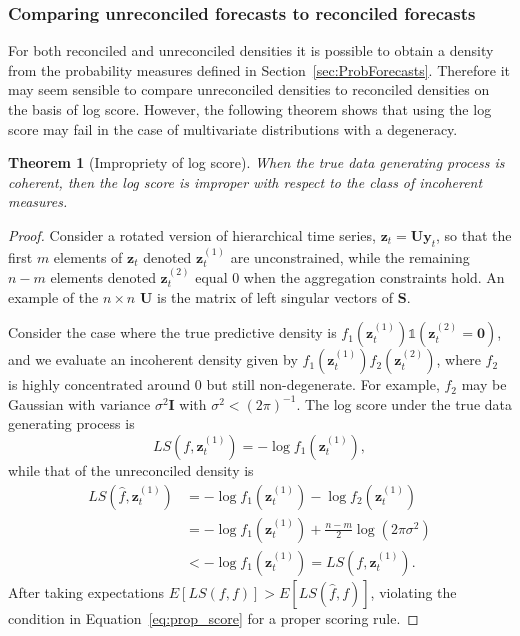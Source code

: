 \documentclass[12pt]{article}
\newtheorem{theo}{Theorem}[section]
\theoremstyle{definition}
\begin{document}
\subsubsection{Comparing unreconciled forecasts to reconciled forecasts}

For both reconciled and unreconciled densities it is possible to obtain a density from the probability measures defined in Section~\ref{sec:ProbForecasts}. Therefore it may seem sensible to compare unreconciled densities to reconciled densities on the basis of log score. However, the following theorem shows that using the log score may fail in the case of multivariate distributions with a degeneracy.

\begin{theo}[Impropriety of log score]\label{theo:logS_improp}
	When the true data generating process is coherent, then the log score is improper with respect to the class of incoherent measures.
\end{theo}

\begin{proof}
	Consider a rotated version of hierarchical time series, $\bm{z}_t=\bm{U}\bm{y}_t$, so that the first $m$ elements of $\bm{z}_t$ denoted $\bm{z}^{(1)}_t$ are unconstrained, while the remaining $n-m$ elements denoted $\bm{z}^{(2)}_t$ equal $0$ when the aggregation constraints hold. An example of the $n\times n$ $\bm{U}$ is the matrix of left singular vectors of $\bm{S}$.
	
	Consider the case where the true predictive density is $f_1(\bm{z}^{(1)}_t)\mathbb{1}\left(\bm{z}^{(2)}_t=\bm{0}\right)$, and we evaluate an incoherent density given by $f_1(\bm{z}^{(1)}_t)f_2(\bm{z}^{(2)}_t)$, where $f_2$ is highly concentrated around $0$ but still non-degenerate. For example, $f_2$ may be Gaussian with variance $\sigma^2{\bm{I}}$ with $\sigma^2 < (2\pi)^{-1}$. The log score under the true data generating process is
	\[
	LS\left(f,\bm{z}^{(1)}_t\right) = -\log f_1\left(\bm{z}^{(1)}_t\right),
	\]
	while that of the unreconciled density is
	\begin{align}
	LS\left(\hat{f},\bm{z}^{(1)}_t\right) &= -\log f_1(\bm{z}^{(1)}_t)- \log f_2(\bm{z}^{(1)}_t)\\
	&= -\log f_1(\bm{z}^{(1)}_t)+\frac{n-m}{2}\log(2\pi\sigma^2)\\
	&<-\log f_1(\bm{z}^{(1)}_t)=LS\left(f,\bm{z}^{(1)}_t\right).
	\end{align}
	After taking expectations $E\left[LS(f,f)\right] > E\left[LS(\hat{f},f)\right]$, violating the condition in Equation~\eqref{eq:prop_score} for a proper scoring rule.
\end{proof}
\end{document}
